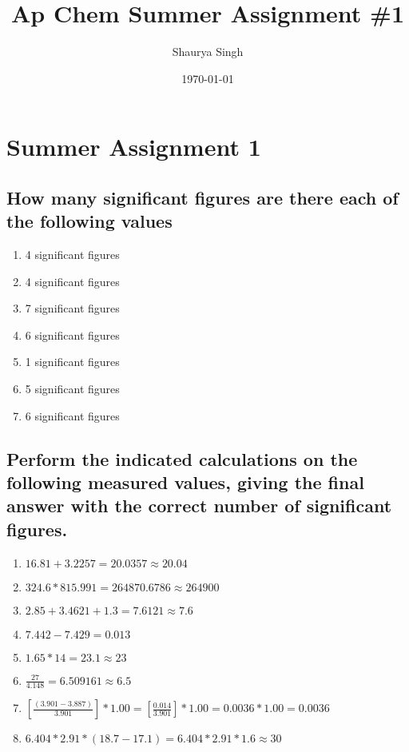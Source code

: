 \documentclass[11pt]{article}
\author{Shaurya Singh}
\date{\today}
\title{Ap Chem Summer Assignment \#1}
\begin{document}
\maketitle

\section{Summer Assignment 1}
\label{sec:orgc0e7cfd}
\subsection{How many significant figures are there each of the following values}
\label{sec:orgb5e0a05}
\begin{enumerate}
\item 4 significant figures
\item 4 significant figures
\item 7 significant figures
\item 6 significant figures
\item 1 significant figures
\item 5 significant figures
\item 6 significant figures
\end{enumerate}

\subsection{Perform the indicated calculations on the following measured values, giving the final answer with the correct number of significant figures.}
\label{sec:org43c0c6f}
\begin{enumerate}
\item \(16.81 + 3.2257 = 20.0357 \approx 20.04\)
\item \(324.6 * 815.991 = 264870.6786 \approx 264900\)
\item \(2.85 + 3.4621 + 1.3 = 7.6121 \approx 7.6\)
\item \(7.442 - 7.429 = 0.013\)
\item \(1.65 * 14 = 23.1 \approx 23\)
\item \(\frac{27}{4.148} = 6.509161 \approx 6.5\)
\item \([\frac{(3.901 - 3.887)}{3.901}] * 1.00 = [\frac{0.014}{3.901}] * 1.00 = 0.0036 * 1.00 = 0.0036\)
\item \(6.404 * 2.91 * (18.7 - 17.1) = 6.404 * 2.91 * 1.6 \approx 30\)
\end{enumerate}
\end{document}
